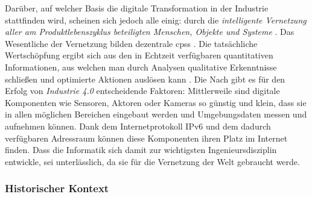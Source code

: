 Darüber, auf welcher Basis die digitale Transformation in der Industrie stattfinden wird, scheinen sich jedoch alle einig: durch die \textit{intelligente Vernetzung aller am Produktlebenszyklus beteiligten Menschen, Objekte und Systeme} \citep{Roth2016}. Das Wesentliche der Vernetzung bilden dezentrale \acf{cpss} \citep{Bendel2019a}. Die tatsächliche Wertschöpfung ergibt sich aus den in Echtzeit verfügbaren quantitativen Informationen, aus welchen man durch Analysen qualitative Erkenntnisse schließen und optimierte Aktionen auslösen kann \citep{Hnisch2017}. Die  Nach \cite{Sendler2016} gibt es für den Erfolg von \textit{Industrie 4.0} entscheidende Faktoren: Mittlerweile sind digitale Komponenten wie Sensoren, Aktoren oder Kameras so günstig und klein, dass sie in allen möglichen Bereichen eingebaut werden und Umgebungsdaten messen und aufnehmen können. Dank dem Internetprotokoll IPv6 und dem dadurch verfügbaren Adressraum können diese Komponenten ihren Platz im Internet finden. Dass die Informatik sich damit zur wichtigsten Ingenieursdisziplin entwickle, sei unterlässlich, da sie für die Vernetzung der Welt gebraucht werde.

\subsubsection{Historischer Kontext}

